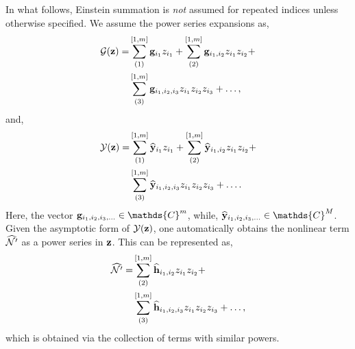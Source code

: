 In what follows, Einstein summation is \emph{not} assumed for repeated indices unless otherwise specified. We assume the power series expansions as,
\begin{align}
	\label{eqn:reduced_normal_form}
	\begin{split}
	\mathcal{G}(\mathbf{z}) =& \sum^{[1,m]}_{(1)}\mathbf{g}_{i_{1}}z_{i_{1}} + \sum^{[1,m]}_{(2)}\mathbf{g}_{i_{1},i_{2}}z_{i_{1}}z_{i_{2}} + \\
	& \sum^{[1,m]}_{(3)}\mathbf{g}_{i_{1},i_{2},i_{3}}z_{i_{1}}z_{i_{2}}z_{i_{3}} + \ldots,
	\end{split}
\end{align}
and, 
\begin{align}
	\label{eqn:asymptotic_normal_form}
	\begin{split}
		\mathcal{Y}(\mathbf{z}) =& \sum^{[1,m]}_{(1)}\widehat{\mathbf{y}}_{i_{1}}z_{i_{1}} + \sum^{[1,m]}_{(2)}\widehat{\mathbf{y}}_{i_{1},i_{2}}z_{i_{1}}z_{i_{2}} + \\
		& \sum^{[1,m]}_{(3)}\widehat{\mathbf{y}}_{i_{1},i_{2},i_{3}}z_{i_{1}}z_{i_{2}}z_{i_{3}} + \ldots .
	\end{split}
\end{align}
Here, the vector $\AsParam_{i_{1},i_{2},i_{3},\ldots} \in \mathds{C}^{m}$, while, $\AsECenM_{i_{1},i_{2},i_{3},\ldots} \in \mathds{C}^{M}$. Given the asymptotic form of $\mathcal{Y}(\mathbf{z})$, one automatically obtains the nonlinear term $\widehat{\mathcal{N}'}$ as a power series in $\mathbf{z}$. This can be represented as,
\begin{align}
	\label{eqn:asymptotic_nonlinear_term}
	\begin{split}
		\widehat{\mathcal{N}'} =& \sum^{[1,m]}_{(2)}\widehat{\mathbf{h}}_{i_{1},i_{2}}z_{i_{1}}z_{i_{2}} + \\
		& \sum^{[1,m]}_{(3)}\widehat{\mathbf{h}}_{i_{1},i_{2},i_{3}}z_{i_{1}}z_{i_{2}}z_{i_{3}} + \ldots,
	\end{split}
\end{align}
which is obtained via the collection of terms with similar powers. 

